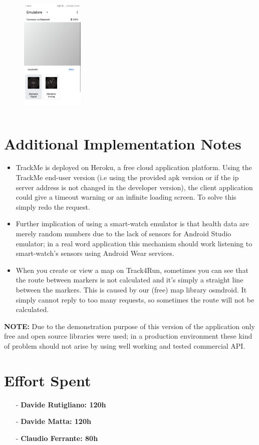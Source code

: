 \documentclass[a4paper]{article}
\begin{document}
\begin{itemize}
\begin{figure}[!htpb]
    \includegraphics[width=30mm, height=60mm]{ITD/images/wearos4.jpeg}
    \end{figure}
\end{itemize}

\newpage

\section{Additional Implementation Notes}
\begin{itemize}
\item TrackMe is deployed on Heroku, a free cloud application platform. Using the TrackMe end-user version (i.e using the provided apk version or if the ip server address is not changed in the developer version), the client application could give a timeout warning or an infinite loading screen. To solve this simply redo the request.
\item Further implication of using a smart-watch emulator is that health data are merely random numbers due to the lack of sensors for Android Studio emulator; in a real word application this mechanism should work listening to smart-watch's sensors using Android Wear services.
\item When you create or view a map on Track4Run, sometimes you can see that the route between markers is not calculated and it's simply a straight line between the markers. This is caused by our (free) map library osmdroid. It simply cannot reply to too many requests, so sometimes the route will not be calculated. 
\end{itemize}
\textbf{NOTE:} Due to the demonstration purpose of this version of the application only free and open source libraries were used; in a production environment these kind of problem should not arise by using well working and tested commercial API.

\newpage
\section{Effort Spent}
    \begin{itemize}
        \item[-] \textbf{Davide Rutigliano: 120h}
        
        \item[-] \textbf{Davide Matta: 120h}
        
        \item[-] \textbf{Claudio Ferrante: 80h}
    \end{itemize}
\end{document}
